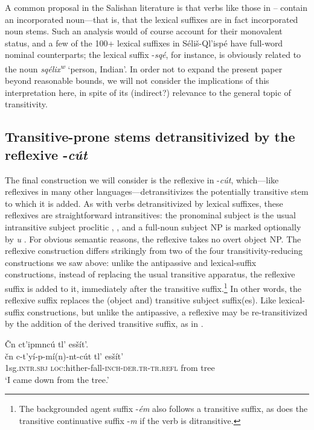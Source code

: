\documentclass[output=paper,colorlinks,citecolor=brown]{langscibook}
\begin{document}
A common proposal in the Salishan literature is that verbs like those
in -- contain an incorporated noun---that is, that the lexical
suffixes are in fact incorporated noun stems.  Such an analysis would
of course account for their monovalent status, and a few of the 100+
lexical suffixes in S\'eli\v{s}-Ql'isp\'e have full-word nominal
counterparts; the lexical suffix -\emph{sq\'e}, for instance, is
obviously related to the noun \emph{sq\'elix\textsuperscript w}
`person, Indian'.  In order not to expand the present paper beyond
reasonable bounds, we will not consider the implications of this
interpretation here, in spite of its (indirect?) relevance to the
general topic of transitivity.

\subsection{Transitive-prone stems detransitivized by the reflexive
 -\emph{c\'ut}}   %
\label{thomason_section_2.9}

The final construction we will consider is the reflexive in
-\emph{c\'ut}, which---like reflexives in many other
languages---detransitivizes the potentially transitive stem to which
it is added.  As with verbs detransitivized by lexical suffixes, these
reflexives are straightforward intransitives: the pronominal subject
is the usual intransitive subject proclitic , , and a full-noun
subject NP is marked optionally by \emph{{\textltilde}u} .  For
obvious semantic reasons, the reflexive takes no overt object NP.  The
reflexive construction differs strikingly from two of the four
transitivity-reducing constructions we saw above: unlike the
antipassive and lexical-suffix constructions, instead of replacing the
usual transitive apparatus, the reflexive suffix is added to it,
immediately after the transitive suffix.\footnote{The backgrounded
agent suffix -\emph{\'em} also follows a transitive suffix, as does
the transitive continuative suffix -\emph{m} if the verb is
ditransitive.}  In other words, the reflexive suffix replaces the
(object and) transitive subject suffix(es).  Like lexical-suffix
constructions, but unlike the antipassive, a reflexive may be
re-transitivized by the addition of the derived transitive suffix, as
in .

\ea 
\label{ex-thomason-41}
\v{C}n ct'ipmnc\'u tl' es\v{s}\'it'.  \\
\gll \v{c}n c-t'y\'i-p-m\'i(n)-nt-c\'ut tl' es\v{s}\'it' \\
1sg.\textsc{intr.sbj} \textsc{loc}:hither-fall-\textsc{inch-der.tr-tr.refl} from tree \\
\glt `I came down from the tree.'
\z
\end{document}

